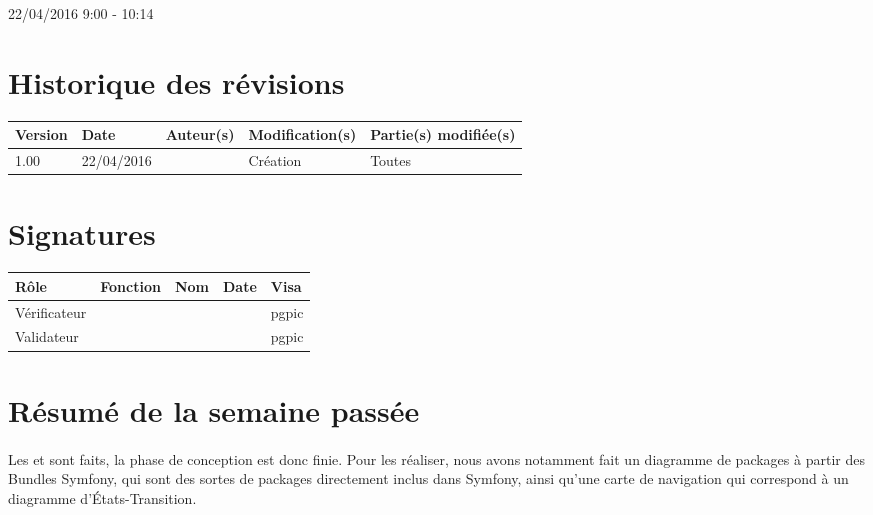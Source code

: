 \documentclass [a4paper] {article}
\begin{document}
22/04/2016			 				%
\hfill   
\hfill 	 9:00 - 10:14				%


\section*{Historique des révisions}
\begin{center}
			\begin{tabular}{| p{2.5cm} | p{3cm} | p{3cm} | p{3cm} | p{3.5cm} |}
				\hline
				\rowcolor{Gray}
				Version & Date & Auteur(s) & Modification(s) & Partie(s) modifiée(s)		 \\
				\hline
				1.00 & 22/04/2016 & \Pierre & Création & Toutes \\
		\hline		
			\end{tabular}
		\end{center}

\section*{Signatures}

		\begin{center}
			\begin{tabular}{| p{2.5cm} | p{4cm} | p{3cm} | p{3cm} | p{2.5cm} |}
				\hline
				\rowcolor{Gray}
				Rôle & Fonction & Nom & Date & Visa		 \\
				\hline
				Vérificateur & \RQA & \Kafui &  & pgpic \\[30pt]
				\hline
				Validateur & \CP & \Sergi &  & pgpic \\[30pt]	
				\hline
			\end{tabular}
		\end{center}


\section{Résumé de la semaine passée}
\paragraph*{}
Les \DCP{} et \DCD{} sont faits, la phase de conception est donc finie. Pour les réaliser, nous avons notamment fait un diagramme de packages à partir des Bundles Symfony, qui sont des sortes de packages directement inclus dans Symfony, ainsi qu'une carte de navigation qui correspond à un diagramme d'États-Transition.
\end{document}
